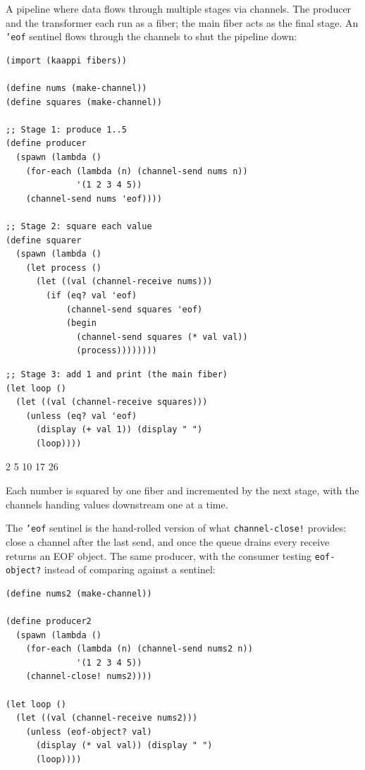 A pipeline where data flows through multiple stages via channels. The producer and the transformer each run as a fiber; the main fiber acts as the final stage. An \texttt{'eof} sentinel flows through the channels to shut the pipeline down:

\begin{lstlisting}
(import (kaappi fibers))

(define nums (make-channel))
(define squares (make-channel))

;; Stage 1: produce 1..5
(define producer
  (spawn (lambda ()
    (for-each (lambda (n) (channel-send nums n))
              '(1 2 3 4 5))
    (channel-send nums 'eof))))

;; Stage 2: square each value
(define squarer
  (spawn (lambda ()
    (let process ()
      (let ((val (channel-receive nums)))
        (if (eq? val 'eof)
            (channel-send squares 'eof)
            (begin
              (channel-send squares (* val val))
              (process))))))))
\end{lstlisting}

\begin{lstlisting}
;; Stage 3: add 1 and print (the main fiber)
(let loop ()
  (let ((val (channel-receive squares)))
    (unless (eq? val 'eof)
      (display (+ val 1)) (display " ")
      (loop))))
\end{lstlisting}

\begin{codeoutput}
2 5 10 17 26
\end{codeoutput}

Each number is squared by one fiber and incremented by the next stage, with the channels handing values downstream one at a time.

The \texttt{'eof} sentinel is the hand-rolled version of what \texttt{channel-close!} provides: close a channel after the last send, and once the queue drains every receive returns an EOF object. The same producer, with the consumer testing \texttt{eof-object?} instead of comparing against a sentinel:

\begin{lstlisting}
(define nums2 (make-channel))

(define producer2
  (spawn (lambda ()
    (for-each (lambda (n) (channel-send nums2 n))
              '(1 2 3 4 5))
    (channel-close! nums2))))

(let loop ()
  (let ((val (channel-receive nums2)))
    (unless (eof-object? val)
      (display (* val val)) (display " ")
      (loop))))
\end{lstlisting}


